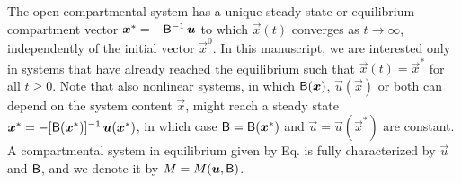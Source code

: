 \documentclass[smallextended]{svjour3}
\makeatletter
\renewcommand*{\eqref}[1]{%
  \hyperref[{#1}]{\textup{\tagform@{\ref*{#1}}}}%
}
\makeatother
\begin{document}
The open compartmental system \eqref{eqn:lin_CS_sys} has a unique steady-state or equilibrium compartment vector $\vec{x}^\ast = -\tens{B}^{-1}\,\vec{u}$ to which $\vec{x}(t)$ converges as $t\to\infty$, independently of the initial vector $\vec{x}^0$.
In this manuscript, we are interested only in systems that have already reached the equilibrium such that $\vec{x}(t)=\vec{x}^\ast$ for all $t\geq0$.
Note that also nonlinear systems, in which $\tens{B}(\vec{x})$, $\vec{u}(\vec{x})$ or both can depend on the system content $\vec{x}$, might reach a steady state $\vec{x}^\ast = -[\tens{B}(\vec{x}^\ast)]^{-1}\,\vec{u}(\vec{x}^\ast)$, in which case $\tens{B}=\tens{B}(\vec{x}^\ast)$ and $\vec{u}=\vec{u}(\vec{x}^\ast)$ are constant.
A compartmental system in equilibrium given by Eq. \eqref{eqn:lin_CS_sys} is fully characterized by $\vec{u}$ and $\mathsf{B}$, and we denote it by $M=M(\vec{u},\tens{B})$.
\end{document}
